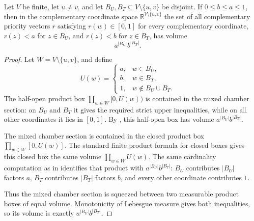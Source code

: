 \begin{helper}
Let \(V\) be finite, let \(u\ne v\), and let
\(B_U,B_T\subseteq V\setminus\{u,v\}\) be disjoint.  If
\(0\le b\le a\le1\), then in the complementary coordinate space
\(\mathbb R^{V\setminus\{u,v\}}\) the set of all complementary priority
vectors \(r\) satisfying \(r(w)\in[0,1]\) for every complementary coordinate,
\(r(z)<a\) for \(z\in B_U\), and \(r(z)<b\) for \(z\in B_T\), has volume
\[
a^{|B_U|}b^{|B_T|}.
\]
\end{helper}
\begin{proof}
Let \(W=V\setminus\{u,v\}\), and define
\[
U(w)=
\begin{cases}
a,&w\in B_U,\\
b,&w\in B_T,\\
1,&w\notin B_U\cup B_T.
\end{cases}
\]
The half-open product box \(\prod_{w\in W}[0,U(w))\) is contained in the
mixed chamber section: on \(B_U\) and \(B_T\) it gives the required strict
upper inequalities, while on all other coordinates it lies in \([0,1]\).
By , this half-open box has
volume \(a^{|B_U|}b^{|B_T|}\).

The mixed chamber section is contained in the closed product box
\(\prod_{w\in W}[0,U(w)]\).  The standard finite product formula for closed
boxes gives this closed box the same volume
\(\prod_{w\in W}U(w)\).  The same cardinality computation as in
 identifies that product with
\(a^{|B_U|}b^{|B_T|}\): \(B_U\) contributes \(|B_U|\) factors \(a\),
\(B_T\) contributes \(|B_T|\) factors \(b\), and every other coordinate
contributes \(1\).

Thus the mixed chamber section is squeezed between two measurable product
boxes of equal volume.  Monotonicity of Lebesgue measure gives both
inequalities, so its volume is exactly \(a^{|B_U|}b^{|B_T|}\).
\end{proof}
